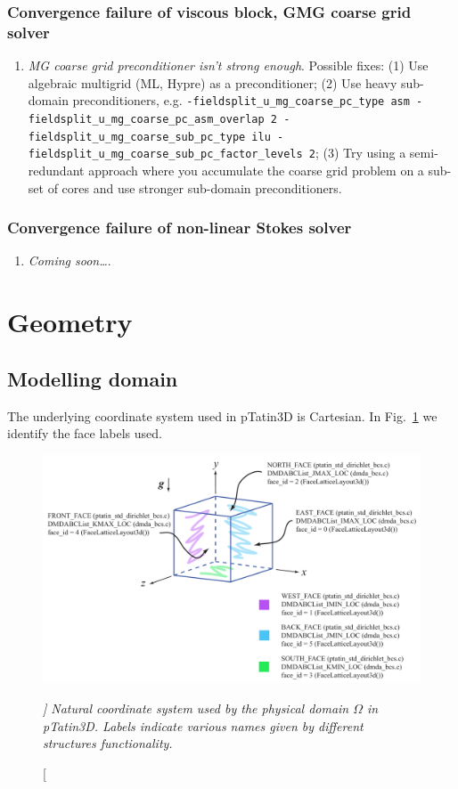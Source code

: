 \documentclass[paper=a4, fontsize=11pt,twoside]{scrartcl}
\newcommand{\ptat}{{{\sc pTatin3D}}}
\newcommand{\unix}[1]{\texttt{\footnotesize #1}}
\begin{document}
{{\subsubsection*{Convergence failure of viscous block, GMG coarse grid solver}
\begin{enumerate}
	\item {\it MG coarse grid preconditioner isn't strong enough}. Possible fixes: 
	(1) Use algebraic multigrid (ML, Hypre) as a preconditioner; 
	(2) Use heavy sub-domain preconditioners, e.g. \unix{-fieldsplit\_u\_mg\_coarse\_pc\_type asm -fieldsplit\_u\_mg\_coarse\_pc\_asm\_overlap 2 
	-fieldsplit\_u\_mg\_coarse\_sub\_pc\_type ilu -fieldsplit\_u\_mg\_coarse\_sub\_pc\_factor\_levels 2};
	(3) Try using a semi-redundant approach where you accumulate the coarse grid problem on a sub-set of cores and use stronger sub-domain preconditioners.
\end{enumerate}

\subsubsection*{Convergence failure of non-linear Stokes solver}
\begin{enumerate}
	\item {\it Coming soon\dots}.
\end{enumerate}



\section{Geometry}

\subsection{Modelling domain}
The underlying coordinate system used in {\ptat} is Cartesian. In Fig.~\ref{fig:domain_coord} we identify the face labels used.
\begin{figure} [hbtp]
\center
\includegraphics[height=0.4\textheight]{figs/pt3d_coordinate_system.pdf}
\caption[\itshape ]
{\itshape Natural coordinate system used by the physical domain $\Omega$ in {\ptat}. Labels indicate various names given by different structures functionality.}
\label{fig:domain_coord}
\end{figure}

}}
\end{document}
